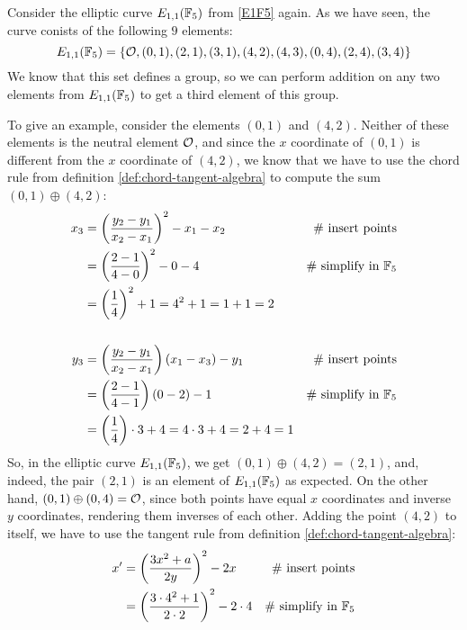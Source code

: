 \begin{example}\label{ex:01+42}
Consider the elliptic curve $E_{1,1}(\mathbb{F}_5)$ from \examplename{} \ref{E1F5} again. As we have seen, the curve conists of the following $9$ elements:
\begin{equation}
E_{1,1}(\mathbb{F}_5) = \{\mathcal{O}, (0,1),(2,1),(3,1),(4,2),(4,3),(0,4),(2,4),(3,4)\}
\end{equation}
We know that this set defines a group, so we can perform addition on any two elements from $E_{1,1}(\mathbb{F}_5)$ to get a third element of this group. 

To give an example, consider the elements $(0,1)$ and $(4,2)$. Neither of these elements is the neutral element $\mathcal{O}$, and since the $x$ coordinate of $(0,1)$ is different from the $x$ coordinate of $(4,2)$, we know that we have to use the chord rule from definition \ref{def:chord-tangent-algebra} to compute the sum $(0,1)\oplus (4,2)$:
\begin{align*}
x_3  & = \left(\frac{y_2-y_1}{x_2-x_1}\right)^2 -x_1-x_2 & \text{\# insert points}\\
     & = \left(\frac{2-1}{4-0}\right)^2 -0-4  & \text{\# simplify in } \mathbb{F}_5\\
     & = \left(\frac{1}{4}\right)^2 +1
       = 4^2 +1
       = 1 +1 
       = 2
\\
\\
y_3  & = \left(\frac{y_2-y_1}{x_2-x_1} \right)\left(x_1-x_3\right) - y_1  & \text{\# insert points}\\     
     & = \left(\frac{2-1}{4-1} \right)\left(0-2\right) - 1   & \text{\# simplify in } \mathbb{F}_5\\    
     & = \left(\frac{1}{4} \right)\cdot 3 + 4   
       = 4\cdot 3 + 4
       = 2 + 4
       = 1          
\end{align*} 
So, in the elliptic curve $E_{1,1}(\mathbb{F}_5)$, we get $(0,1)\oplus (4,2) =(2,1)$, and, indeed, the pair $(2,1)$ is an element of $E_{1,1}(\mathbb{F}_5)$ as expected. On the other hand, $(0,1)\oplus (0,4) =\mathcal{O}$, since both points have equal $x$ coordinates and inverse $y$ coordinates, rendering them inverses of each other. Adding the point $(4,2)$ to itself, we have to use the tangent rule from definition \ref{def:chord-tangent-algebra}:
\begin{align*}
x'  & = \left(\frac{3x^2+a}{2y}\right)^2 -2x   & \text{\# insert points}\\
    & = \left(\frac{3\cdot 4^2+1}{2\cdot 2}\right)^2 -2\cdot 4 & \text{\# simplify in } \F_5 \\

\end{align*}
\end{example}
